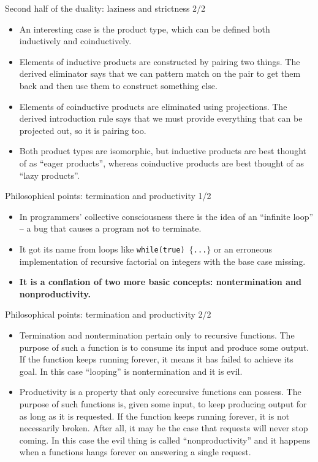 \documentclass{beamer}
\begin{document}
\begin{frame}{Second half of the duality: laziness and strictness 2/2}
\begin{itemize}
	\item An interesting case is the product type, which can be defined both inductively and coinductively.
	\item Elements of inductive products are constructed by pairing two things. The derived eliminator says that we can pattern match on the pair to get them back and then use them to construct something else.
	\item Elements of coinductive products are eliminated using projections. The derived introduction rule says that we must provide everything that can be projected out, so it is pairing too.
	\item Both product types are isomorphic, but inductive products are best thought of as ``eager products'', whereas coinductive products are best thought of as ``lazy products''.
\end{itemize}
\end{frame}

\begin{frame}{Philosophical points: termination and productivity 1/2}
\begin{itemize}
	\item In programmers' collective consciousness there is the idea of an ``infinite loop'' -- a bug that causes a program not to terminate.
	\item  It got its name from loops like \texttt{while(true) $\lbrace$...$\rbrace$} or an erroneous implementation of recursive factorial on integers with the base case missing.
	\item \textbf{It is a conflation of two more basic concepts: nontermination and nonproductivity.}
\end{itemize}
\end{frame}

\begin{frame}{Philosophical points: termination and productivity 2/2}
\begin{itemize}
	\item Termination and nontermination pertain only to recursive functions. The purpose of such a function is to consume its input and produce some output. If the function keeps running forever, it means it has failed to achieve its goal. In this case ``looping'' is nontermination and it is evil.
	\item Productivity is a property that only corecursive functions can possess. The purpose of such functions is, given some input, to keep producing output for as long as it is requested. If the function keeps running forever, it is not necessarily broken. After all, it may be the case that requests will never stop coming. In this case the evil thing is called ``nonproductivity'' and it happens when a functions hangs forever on answering a single request.
\end{itemize}
\end{frame}
\end{document}

